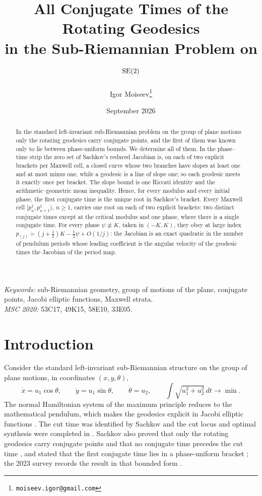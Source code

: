 \documentclass[11pt]{article}
\title{All Conjugate Times of the Rotating Geodesics\\
in the Sub-Riemannian Problem on $\operatorname{SE}(2)$}
\author{Igor Moiseev\thanks{\texttt{moiseev.igor@gmail.com}}}
\date{September 2026}
\theoremstyle{remark}
\begin{document}
\setlength{\emergencystretch}{2em}
\maketitle

\begin{abstract}
In the standard left-invariant sub-Riemannian problem on the group of plane
motions only the rotating geodesics carry conjugate points, and the first
of them was known only to lie between phase-uniform bounds.  We determine all of them.
In the phase--time strip the zero set of Sachkov's reduced Jacobian is, on
each of two explicit brackets per Maxwell cell, a closed curve whose two
branches have slopes at least one and at most minus one, while a geodesic
is a line of slope one; so each geodesic meets it exactly once per
bracket.  The slope bound is one Riccati identity and the
arithmetic--geometric mean inequality.  Hence, for every modulus and every
initial phase, the first conjugate time is the unique root in Sachkov's
bracket.  Every Maxwell cell $[p_n^1,p_{n+1}^1)$, $n\ge1$, carries one
root on each of two explicit brackets: two distinct conjugate times except
at the critical modulus and one phase, where there is a single conjugate time.  For every phase
$\psi\not\equiv K$, taken in $(-K,K)$, they obey at large index
$p_{(j)}=(j+\tfrac12)K-\tfrac12\psi+O(1/j)$: the Jacobian is an exact
quadratic in the number of pendulum periods whose leading coefficient is the
angular velocity of the geodesic times the Jacobian of the period map.
\end{abstract}
\noindent\textit{Keywords:} sub-Riemannian geometry, group of motions of the plane, conjugate points, Jacobi elliptic functions, Maxwell strata.\\
\textit{MSC 2020:} 53C17, 49K15, 58E10, 33E05.

\section{Introduction}

Consider the standard left-invariant sub-Riemannian structure on the group of
plane motions, in coordinates $(x,y,\theta)$,
\begin{equation}\label{eq:control-system}
 \dot x=u_1\cos\theta,\qquad
 \dot y=u_1\sin\theta,\qquad
 \dot\theta=u_2,
 \qquad \int\sqrt{u_1^2+u_2^2}\,dt\to\min .
\end{equation}
The normal Hamiltonian system of the maximum principle reduces to the
mathematical pendulum, which makes the geodesics explicit in Jacobi
elliptic functions \cite{AgrachevSachkov2004,MoiseevSachkov2010Maxwell}.
The cut time was identified by Sachkov \cite{Sachkov2010Conjugate} and the
cut locus and optimal synthesis were completed in \cite{Sachkov2011CutLocus}.
Sachkov also proved that only the rotating geodesics carry conjugate
points \cite[Theorems~2.1, 2.4]{Sachkov2010Conjugate} and that no conjugate
time precedes the cut time \cite[Theorems~2.2, 2.3]{Sachkov2010Conjugate},
and stated that the first conjugate time lies in a phase-uniform bracket
\cite[eq.~(2.18)]{Sachkov2010Conjugate}; the 2023
survey records the result in that bounded form \cite[Theorem~2.9]{Sachkov2023Survey}.
\end{document}
